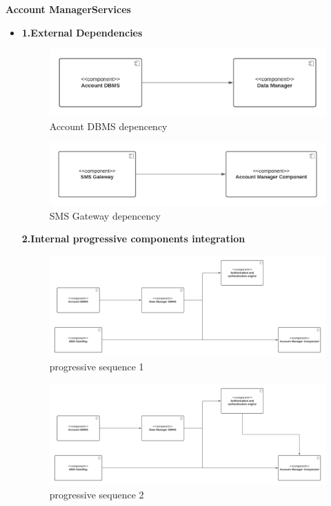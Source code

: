 \textbf{Account ManagerServices}
\begin{itemize}
    \item \textbf{1.External Dependencies}
    \begin{figure}[h!]
        \centering
        \includegraphics[width=1\textwidth]{Images/Test Diagram/Account/ExternalDependenciesDBMS.png}
        \caption{\label{fig:AccountExternalDepDBMS}{Account DBMS depencency}}
    \end{figure}  
    
    \begin{figure}[h!]
        \centering
        \includegraphics[width=1\textwidth]{Images/Test Diagram/Account/ExternalDependenciesSMS.png}
        \caption{\label{fig:AccountExternalDepSMS}{SMS Gateway depencency}}
    \end{figure}  
    \textbf{2.Internal progressive components integration}
    \begin{figure}[h!]
        \centering
        \includegraphics[width=1\textwidth]{Images/Test Diagram/Account/subAccount 1.png}
        \caption{\label{fig:progressiveAccount1}{progressive sequence 1}}
    \end{figure} 
    \begin{figure}[h!]
        \centering
        \includegraphics[width=1\textwidth]{Images/Test Diagram/Account/subAccount 2.png}
        \caption{\label{fig:progressiveAccount1}{progressive sequence 2}}
    \end{figure} 

\end{itemize}


